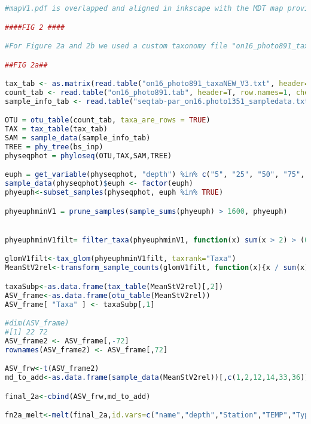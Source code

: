 \documentclass{article}
\begin{document}
\begin{lstlisting}[language=R,caption={N1N2figscripts}]
#mapV1.pdf is overlapped and aligned in inkscape with the MDT map provided by Alice Della Penna and Peter Gaube. Colors were modified for better visualization when overlapped with the MDT.

####FIG 2 ####

#For Figure 2a and 2b we used a custom taxonomy file "on16_photo891_taxaNEW_V3"

##FIG 2a##

tax_tab <- as.matrix(read.table("on16_photo891_taxaNEW_V3.txt", header=T, row.names=1, check.names=F, na.strings="", sep="\t"))
count_tab <- read.table("on16_photo891.tab", header=T, row.names=1, check.names=F)
sample_info_tab <- read.table("seqtab-par_on16.photo1351_sampledata.txt", header=T, row.names=1, check.names=F, sep ="\t")

OTU = otu_table(count_tab, taxa_are_rows = TRUE)
TAX = tax_table(tax_tab)
SAM = sample_data(sample_info_tab)
TREE = phy_tree(bs_inp) 
physeqphot = phyloseq(OTU,TAX,SAM,TREE)

euph = get_variable(physeqphot, "depth") %in% c("5", "25", "50", "75", "100")
sample_data(physeqphot)$euph <- factor(euph)
phyeuph<-subset_samples(physeqphot, euph %in% TRUE)

phyeuphminV1 = prune_samples(sample_sums(phyeuph) > 1600, phyeuph)


phyeuphminV1filt= filter_taxa(phyeuphminV1, function(x) sum(x > 2) > (0.015*length(x)), TRUE)

glomV1filt<-tax_glom(phyeuphminV1filt, taxrank="Taxa")
MeanStV2rel<-transform_sample_counts(glomV1filt, function(x){x / sum(x)})

taxaSubp<-as.data.frame(tax_table(MeanStV2rel)[,2])
ASV_frame<-as.data.frame(otu_table(MeanStV2rel))
ASV_frame[ "Taxa" ] <- taxaSubp[,1]

#dim(ASV_frame)
#[1] 22 72
ASV_frame2 <- ASV_frame[,-72]
rownames(ASV_frame2) <- ASV_frame[,72]

ASV_frw<-t(ASV_frame2)
md_to_add<-as.data.frame(sample_data(MeanStV2rel))[,c(1,2,12,14,33,36)]

final_2a<-cbind(ASV_frw,md_to_add)

fn2a_melt<-melt(final_2a,id.vars=c("name","depth","Station","TEMP","Type","position"), measure.vars = c("Diatoms","Bolidophyceae","Dictyochophyceae","Pelagophyceae","Chrysophyceae","Micromonas","Bathycoccus","OstreococcusI","OstreococcusII","Cryptophyceae","Prymnesiophyceae","Rappemonad", "ASV357","Other plastid","ProchlorococcusHLI","ProchlorococcusHLII","ProchlorococcusLLI","SynechococcusI","SynechococcusIV","SynechococcusII","Other Cyanobacteria","Not assigned"))


\end{lstlisting}
\end{document}
